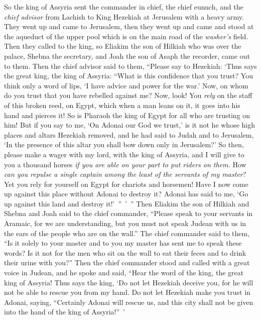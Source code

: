 \begin{biblechapter}
\verse So the king of Assyria sent the commander in chief, the chief eunuch, and the \textit{chief advisor} from Lachish to King Hezekiah at Jerusalem with a heavy army. They went up and came to Jerusalem, then they went up and came and stood at the aqueduct of the upper pool which is on the main road of the \textit{washer’s} field.
\verse Then they called to the king, so Eliakim the son of Hilkiah who was over the palace, Shebna the secretary, and Joah the son of Asaph the recorder, came out to them.
 Then the chief advisor said to them, “Please say to Hezekiah: ‘Thus says the great king, the king of Assyria: “What is this confidence that you trust?
\verse You think only a word of lips, ‘I have advice and power for the war.’ Now, on whom do you trust that you have rebelled against me?
\verse Now, look! You \textit{rely} on the staff of this broken reed, on Egypt, which when a man leans on it, it goes into his hand and pierces it! So is Pharaoh the king of Egypt for all who are trusting on him!
\verse But if you say to me, ‘On Adonai our God we trust,’ is it not he whose high places and altars Hezekiah removed, and he had said to Judah and to Jerusalem, ‘In the presence of this altar you shall bow down only in Jerusalem?’
\verse So then, please make a wager with my lord, with the king of Assyria, and I will give to you a thousand horses \textit{if you are able on your part to put riders on them.}
\verse How \textit{can you repulse a single captain among the least of the servants of my master}? Yet you rely for yourself on Egypt for chariots and horsemen!
\verse Have I now come up against this place without Adonai to destroy it? Adonai has said to me, ‘Go up against this land and destroy it!’ ” ’ ”
\verse Then Eliakim the son of Hilkiah and Shebna and Joah said to the chief commander, “Please speak to your servants in Aramaic, for we are understanding, but you must not speak Judean with us in the ears of the people who are on the wall.”
\verse The chief commander said to them, “Is it solely to your master and to you my master has sent me to speak these words? Is it not for the men who sit on the wall to eat their feces and to drink their urine with you?”
\verse Then the chief commander stood and called with a great voice in Judean, and he spoke and said, “Hear the word of the king, the great king of Assyria!
\verse Thus says the king, ‘Do not let Hezekiah deceive you, for he will not be able to rescue you from my hand.
\verse Do not let Hezekiah make you trust in Adonai, saying, “Certainly Adonai will rescue us, and this city shall not be given into the hand of the king of Assyria!” ’

\end{biblechapter}
